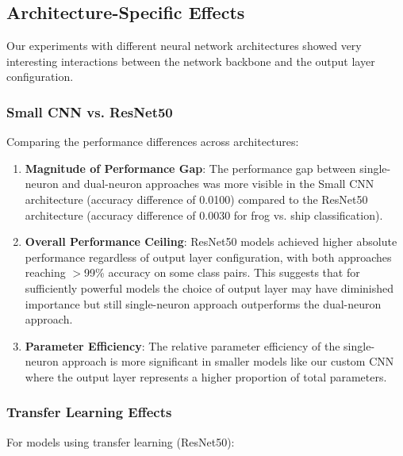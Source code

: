 \subsection{Architecture-Specific Effects}

Our experiments with different neural network architectures showed very interesting interactions between the network backbone and the output layer configuration.

\subsubsection{Small CNN vs. ResNet50}

Comparing the performance differences across architectures:

\begin{enumerate}
\item \textbf{Magnitude of Performance Gap}: The performance gap between single-neuron and dual-neuron approaches was more visible in the Small CNN architecture (accuracy difference of 0.0100) compared to the ResNet50 architecture (accuracy difference of 0.0030 for frog vs. ship classification).

\item \textbf{Overall Performance Ceiling}: ResNet50 models achieved higher absolute performance regardless of output layer configuration, with both approaches reaching $>$99\% accuracy on some class pairs. This suggests that for sufficiently powerful models the choice of output layer may have diminished importance but still single-neuron approach outperforms the dual-neuron approach.

\item \textbf{Parameter Efficiency}: The relative parameter efficiency of the single-neuron approach is more significant in smaller models like our custom CNN where the output layer represents a higher proportion of total parameters.
\end{enumerate}

\subsubsection{Transfer Learning Effects}

For models using transfer learning (ResNet50):

